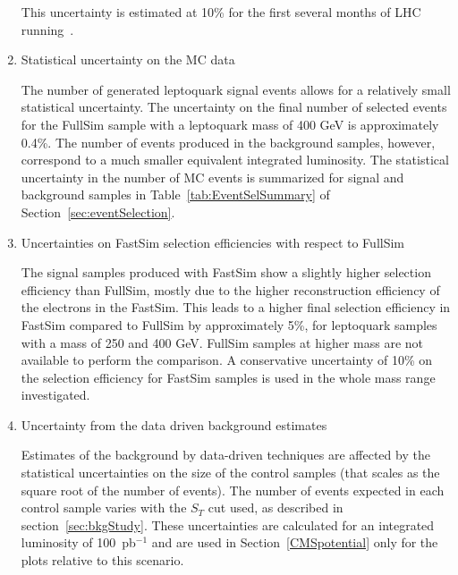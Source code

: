 \begin{enumerate}
This uncertainty is estimated at 10\% for the first several months of LHC running~\cite{Ball:2007zza}. 
%
\item Statistical uncertainty on the MC data

The number of generated leptoquark signal events allows for a relatively small statistical uncertainty.
The uncertainty on the final number of selected events for the FullSim sample with a leptoquark mass of 400 GeV is 
approximately 0.4\%.  The number of events produced in the background samples, however, correspond to a much
smaller equivalent integrated luminosity.  
The statistical uncertainty in the number of MC events is summarized for signal and background samples 
in Table~\ref{tab:EventSelSummary} of Section~\ref{sec:eventSelection}.  
%
\item Uncertainties on FastSim selection efficiencies with respect to FullSim

The signal samples produced with FastSim show a slightly higher selection efficiency than FullSim, 
mostly due to the higher reconstruction efficiency of the electrons in the FastSim. 
This leads to a higher final selection efficiency in FastSim compared to FullSim by approximately 5\%, 
for leptoquark samples with a mass of 250 and 400 GeV. FullSim samples at higher mass are not available 
to perform the comparison. A conservative uncertainty of 10\% on the selection efficiency 
for FastSim samples is used in the whole mass range investigated. 
%
\item Uncertainty from the data driven background estimates

Estimates of the background by data-driven techniques are affected by the statistical
uncertainties on the size of the control samples (that scales as the square root of the number of events).
The number of events expected in each control sample varies with the $S_T$ cut used, as 
described in section~\ref{sec:bkgStudy}. 
These uncertainties are calculated for an integrated luminosity of 100~pb$^{-1}$ 
and are used in Section~\ref{CMSpotential} only for the plots relative to this scenario.




\end{enumerate}
